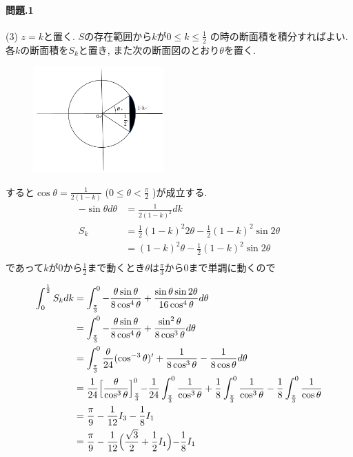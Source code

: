 \documentclass[11pt]{jarticle}
\begin{document}
\title{}
\date{}
\maketitle
\paragraph{問題.1}
(3) $z=k$と置く. $S$の存在範囲から$k$が$0\leq k \leq \frac{1}{2}$
の時の断面積を積分すればよい. 各$k$の断面積を$S_k$と置き, また次の断面図のとおり$\theta$を置く.
\begin{figure}[H]
\centering
\includegraphics[width=5cm]{fig.png}
\end{figure}
すると$\cos\theta=\frac{1}{2(1-k)}$ ($0 \leq \theta < \frac{\pi}{2}$ )が成立する. 
\begin{align*}
-\sin \theta d\theta& =\frac{1}{2(1-k)^2}dk\\
 S_k & = \frac{1}{2}(1-k)^2 2\theta-\frac{1}{2}(1-k)^2\sin2\theta\\
  &=(1-k)^2\theta-\frac{1}{2}(1-k)^2\sin2\theta\\
\end{align*}
であって$k$が$0$から$\frac{1}{2}$まで動くとき$\theta$は$\frac{\pi}{3}$から$0$まで単調に動くので

\begin{align*}
  \int_0^\frac{1}{2} S_k dk&=\int_\frac{\pi}{3}^0 -\frac{\theta\sin\theta}{8\cos^4\theta}+\frac{\sin\theta\sin 2\theta}{16\cos^4\theta} d\theta\\
                                  &=\int_\frac{\pi}{3}^0 -\frac{\theta\sin\theta}{8\cos^4\theta}+\frac{\sin^2\theta}{8\cos^3\theta} d\theta\\
  &=\int_\frac{\pi}{3}^0\frac{\theta}{24}(\cos^{-3}\theta)'+\frac{1}{8\cos^3\theta}-\frac{1}{8\cos\theta} d\theta\\
  &=\frac{1}{24}\Bigl[\frac{\theta}{\cos^3\theta}\Bigl]_\frac{\pi}{3}^{0}-\frac{1}{24}\int_\frac{\pi}{3}^0\frac{1}{\cos^3\theta}+\frac{1}{8}\int_\frac{\pi}{3}^0\frac{1}{\cos^3\theta}-\frac{1}{8}\int_\frac{\pi}{3}^0\frac{1}{\cos\theta}\\
  &=\frac{\pi}{9}-\frac{1}{12}I_3-\frac{1}{8}I_1\\
  &=\frac{\pi}{9}-\frac{1}{12}\Bigl(\frac{\sqrt3}{2}+\frac{1}{2}I_1\Bigl)-\frac{1}{8}I_1
\end{align*}
\end{document}

